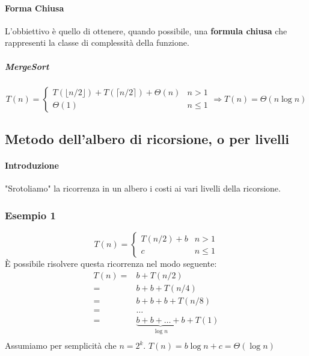         \paragraph{Forma Chiusa} L'obbiettivo è quello di ottenere, quando possibile, una \textbf{formula chiusa} che rappresenti la classe di complessità della funzione.
            \subparagraph{MergeSort}
                $$ 
                    T(n) = \begin{cases}
                        T(\lfloor n/2 \rfloor) + T(\lceil n/2 \rceil) + \Theta(n) & n > 1 \\
                        \Theta(1) & n \leq 1
                    \end{cases} \Longrightarrow T(n) = \Theta(n\log n)
                $$
    \subsection{Metodo dell'albero di ricorsione, o per livelli}
        \paragraph{Introduzione} "Srotoliamo" la ricorrenza in un albero i costi ai vari livelli della ricorsione.
        \subsubsection{Esempio 1}
            $$
                T(n)=\begin{cases}
                    T(n/2) + b & n>1 \\
                    c & n\leq 1
                \end{cases}
            $$
            È possibile risolvere questa ricorrenza nel modo seguente:
            $$
                \begin{aligned}
                    T(n) = & b + T(n/2) \\
                    = & b + b + T(n/4) \\
                    = & b + b + b + T(n/8) \\
                    = & \ldots \\
                    = & \underbrace{b+b+\ldots+b}_{\log n} + T(1) \\
                \end{aligned}
            $$
            Assumiamo per semplicità che $ n=2^k $. $ T(n) = b\log n + c = \Theta(\log n) $
